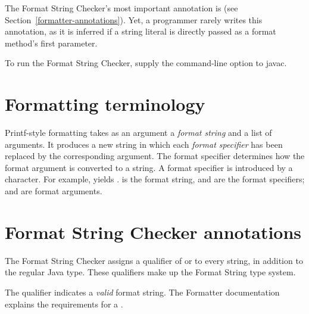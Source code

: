 The Format String Checker's most important annotation is
 (see
Section~\ref{formatter-annotations}). Yet, a programmer rarely writes this annotation, as it is inferred if a string literal is directly passed as
a format method's first parameter.

To run the Format String Checker, supply the  command-line option to javac. 

\section{Formatting terminology\label{formatter-terminology}}

Printf-style formatting takes as an argument a \emph{format string} and a
list of arguments.  It produces a new string in which each \emph{format
  specifier} has been replaced by the corresponding argument.
The format specifier determines how the format argument is converted to a
string.
A format specifier is introduced by a \code{\%} character. For example,
 yields
.   is
the format string,  and  are the format specifiers;
 and  are format arguments.


\section{Format String Checker annotations\label{formatter-annotations}}


The Format String Checker assigns a qualifier of
 or  to every string, in addition to the
regular Java type. These qualifiers make up the Format String type system.

The  qualifier indicates a
\emph{valid} format string.  The Formatter documentation explains the
requirements for a .


